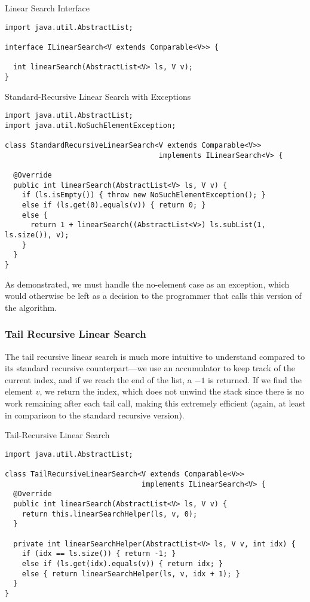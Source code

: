 \begin{cl}[]{Linear Search Interface}
\begin{lstlisting}[language=MyJava]
import java.util.AbstractList;

interface ILinearSearch<V extends Comparable<V>> {
  
  int linearSearch(AbstractList<V> ls, V v);
}
\end{lstlisting}
\end{cl}

\begin{cl}[]{Standard-Recursive Linear Search with Exceptions}
\begin{lstlisting}[language=MyJava]
import java.util.AbstractList;
import java.util.NoSuchElementException;
  
class StandardRecursiveLinearSearch<V extends Comparable<V>> 
                                    implements ILinearSearch<V> {
  
  @Override
  public int linearSearch(AbstractList<V> ls, V v) {
    if (ls.isEmpty()) { throw new NoSuchElementException(); }
    else if (ls.get(0).equals(v)) { return 0; }
    else { 
      return 1 + linearSearch((AbstractList<V>) ls.subList(1, ls.size()), v); 
    }
  }
}
\end{lstlisting}
\end{cl}

As demonstrated, we must handle the no-element case as an exception, which would otherwise be left as a decision to the programmer that calls this version of the  algorithm.

\subsubsection*{Tail Recursive Linear Search}

The tail recursive linear search is much more intuitive to understand compared to its standard recursive counterpart---we use an accumulator to keep track of the current index, and if we reach the end of the list, a $-1$ is returned. If we find the element $v$, we return the index, which does not unwind the stack since there is no work remaining after each tail call, making this extremely efficient (again, at least in comparison to the standard recursive version).

\begin{cl}[]{Tail-Recursive Linear Search}
\begin{lstlisting}[language=MyJava]
import java.util.AbstractList;

class TailRecursiveLinearSearch<V extends Comparable<V>> 
                                implements ILinearSearch<V> {
  @Override
  public int linearSearch(AbstractList<V> ls, V v) {
    return this.linearSearchHelper(ls, v, 0);
  }

  private int linearSearchHelper(AbstractList<V> ls, V v, int idx) {
    if (idx == ls.size()) { return -1; }
    else if (ls.get(idx).equals(v)) { return idx; }
    else { return linearSearchHelper(ls, v, idx + 1); }
  }
}
\end{lstlisting}
\end{cl}

